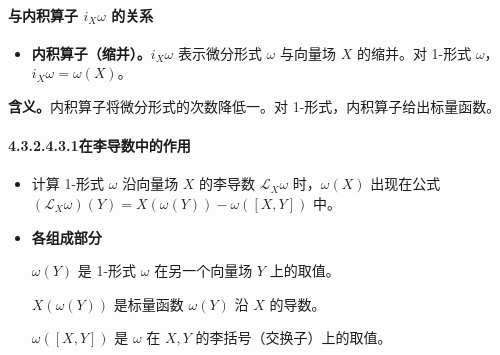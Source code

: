 \paragraph{\texorpdfstring{与内积算子 $i_X\omega$ 的关系}{与内积算子 iₓω 的关系}}
\begin{itemize}
  \item \textbf{内积算子（缩并）。}$i_X\omega$ 表示微分形式 $\omega$ 与向量场 $X$ 的缩并。对 1-形式 $\omega$，$i_X\omega=\omega(X)$。
\end{itemize}

\textbf{含义。}内积算子将微分形式的次数降低一。对 1-形式，内积算子给出标量函数。

\paragraph*{4.3.2.4.3.1\quad 在李导数中的作用}
\begin{itemize}
  \item 计算 1-形式 $\omega$ 沿向量场 $X$ 的李导数 $\mathcal L_X\omega$ 时，$\omega(X)$ 出现在公式 $(\mathcal L_X\omega)(Y)=X(\omega(Y))-\omega([X,Y])$ 中。
  \item \textbf{各组成部分}

  $\omega(Y)$ 是 1-形式 $\omega$ 在另一个向量场 $Y$ 上的取值。

  $X(\omega(Y))$ 是标量函数 $\omega(Y)$ 沿 $X$ 的导数。

  $\omega([X,Y])$ 是 $\omega$ 在 $X,Y$ 的李括号（交换子）上的取值。
\end{itemize}

